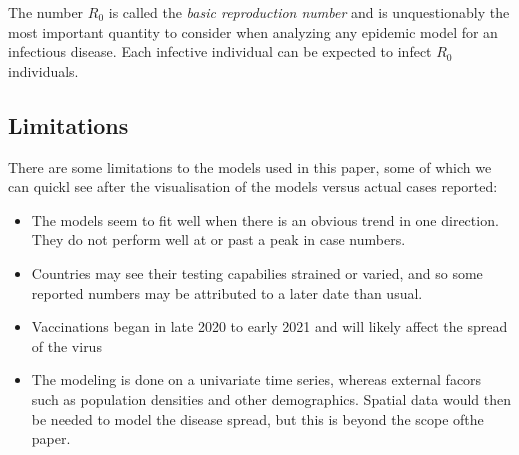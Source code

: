 \begin{ndefinition} 
The number $R_0$ is called
the \textit{basic reproduction number} and is unquestionably the most important quantity to consider when analyzing any epidemic model for an infectious disease. Each infective individual can be expected to infect $R_0$ individuals. 
\end{ndefinition}

\subsection{Limitations}
There are some limitations to the models used in this paper, some of which we can quickl see after the visualisation of the models versus actual cases reported:
\begin{itemize}
\item The models seem to fit well when there is an obvious trend in one direction. They do not perform well at or past a peak in case numbers. 
\item Countries may see their testing capabilies strained or varied, and so some reported numbers may be attributed to a later date than usual.
\item Vaccinations began in late 2020 to early 2021 and will likely affect the spread of the virus
\item The modeling is done on a univariate time series, whereas external facors such as population densities and other demographics. Spatial data would then be needed to model the disease spread, but this is beyond the scope ofthe paper.
\end{itemize}